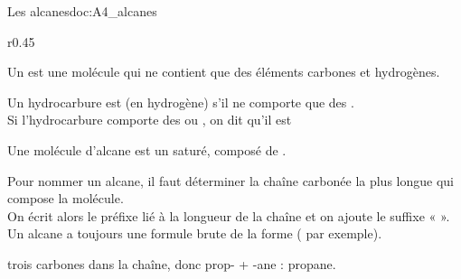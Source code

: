 
\begin{doc}{Les alcanes}{doc:A4_alcanes}
  \begin{wrapfigure}{r}{0.45\linewidth}   
    \vspace*{-30pt}
    \begin{boite}
      \begin{importants}
        Un  est une molécule qui ne contient que des éléments carbones et hydrogènes.
      \end{importants}
      \begin{importants}
        Un hydrocarbure est  (en hydrogène) s'il ne comporte que des . \\
        Si l'hydrocarbure comporte des  ou , on dit qu'il est 
      \end{importants}
    \end{boite}
  \end{wrapfigure}
  \phantom{b}\vspace*{-14pt}
  
  \begin{importants}
    Une molécule d'alcane est un  saturé, composé de .
  \end{importants}
  Pour nommer un alcane, il faut déterminer la chaîne carbonée la plus longue qui compose la molécule. \\
  On écrit alors le préfixe lié à la longueur de la chaîne et on ajoute le suffixe «  ». \\
  Un alcane a toujours une formule brute de la forme  ( par exemple).
  
  \vspace*{4pt}
  \exemple {} trois carbones dans la chaîne, donc prop- + -ane : propane.
\end{doc}



